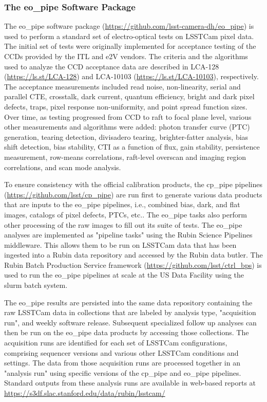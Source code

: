 \subsubsection{The eo\_pipe Software Package}

The eo\_pipe software package (\url{https://github.com/lsst-camera-dh/eo_pipe}) is used to perform a standard set of electro-optical tests on LSSTCam pixel data. The initial set of tests were originally implemented for acceptance testing of the CCDs provided by the ITL and e2V vendors.  The criteria and the algorithms used to analyze the CCD acceptance data are described in LCA-128 (\url{https://ls.st/LCA-128}) and LCA-10103 (\url{https://ls.st/LCA-10103}), respectively.  The acceptance measurements included read noise, non-linearity, serial and parallel CTE, crosstalk, dark current, quantum efficiency, bright and dark pixel defects, traps, pixel response non-uniformity, and point spread function sizes.  Over time, as testing progressed from CCD to raft to focal plane level, various other measurements and algorithms were added: photon transfer curve (PTC) generation, tearing detection, divisadero tearing, brighter-fatter analysis, bias shift detection, bias stability, CTI as a function of flux, gain stability, persistence measurement, row-means correlations, raft-level overscan and imaging region correlations, and scan mode analysis.

To ensure consistency with the official calibration products, the cp\_pipe pipelines (\url{https://github.com/lsst/cp_pipe}) are run first to generate various data products that are inputs to the eo\_pipe pipelines, i.e., combined bias, dark, and flat images, catalogs of pixel defects, PTCs, etc..  The eo\_pipe tasks also perform other processing of the raw images to fill out its suite of tests.  The eo\_pipe analyses are implemented as "pipeline tasks" using the Rubin Science Pipelines middleware.  This allows them to be run on LSSTCam data that has been ingested into a Rubin data repository and accessed by the Rubin data butler.   The Rubin Batch Production Service framework (\url{https://github.com/lsst/ctrl_bps}) is used to run the eo\_pipe pipelines at scale at the US Data Facility using the slurm batch system.

The eo\_pipe results are persisted into the same data repository containing the raw LSSTCam data in collections that are labeled by analysis type, "acquisition run", and weekly software release.  Subsequent specialized follow up analyses can then be run on the eo\_pipe data products by accessing those collections.  The acquisition runs are identified for each set of LSSTCam configurations, comprising sequencer versions and various other LSSTCam conditions and settings.  The data from those acquisition runs are processed together in an "analysis run" using specific versions of the cp\_pipe and eo\_pipe pipelines.  Standard outputs from these analysis runs are available in web-based reports at \url{https://s3df.slac.stanford.edu/data/rubin/lsstcam/}